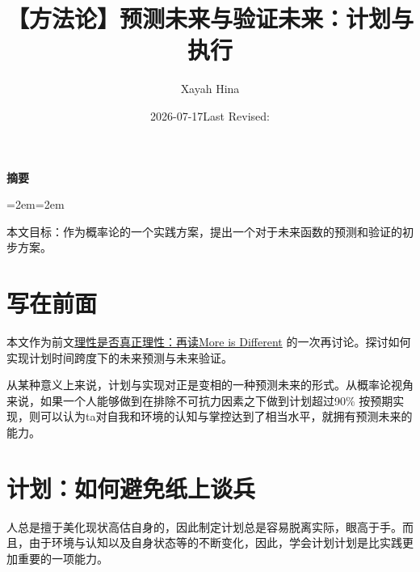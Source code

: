 \documentclass[11pt,twoside,fontset=none,scheme=plain]{ctexart}
\title{【方法论】预测未来与验证未来：计划与执行}
\author{Xayah Hina}
\date{2026-07-17\quad\textperiodcentered\quad Last Revised: \writinglastrevised}
\makeatletter
\renewcommand{\abstractname}{摘要}
\renewenvironment{abstract}{%
    \begin{center}
    \small\sffamily\bfseries\color{bookink}\abstractname
    \end{center}
    \begin{list}{}{\leftmargin=2em\rightmargin=2em}
    \item\relax\small\color{mutedink}\noindent\ignorespaces
}{%
    \end{list}
    \vspace{1.2em}
}
\renewcommand{\maketitle}{%
    \thispagestyle{plain}%
    \begin{center}
        \vspace*{0.6em}
        {\LARGE\sffamily\bfseries\color{bookink}\@title\par}
        \vspace{1em}
        {\small\color{mutedink}\@author\quad\textperiodcentered\quad\@date\par}
    \end{center}
    \vspace{1.8em}
}
\makeatother
\begin{document}
    \maketitle

    \begin{abstract}
        本文目标：作为概率论的一个实践方案，提出一个对于未来函数的预测和验证的初步方案。
    \end{abstract}


    \section{写在前面}
    本文作为前文\href{https://media.xayah.me/writing/20260715-090945/20260715-090945.pdf}{理性是否真正理性：再读More is Different} 的一次再讨论。探讨如何实现计划时间跨度下的未来预测与未来验证。

    从某种意义上来说，计划与实现对正是变相的一种预测未来的形式。从概率论视角来说，如果一个人能够做到在排除不可抗力因素之下做到计划超过90\% 按预期实现，则可以认为ta对自我和环境的认知与掌控达到了相当水平，就拥有预测未来的能力。


    \section{计划：如何避免纸上谈兵}
    人总是擅于美化现状高估自身的，因此制定计划总是容易脱离实际，眼高于手。而且，由于环境与认知以及自身状态等的不断变化，因此，学会计划计划是比实践更加重要的一项能力。
\end{document}
